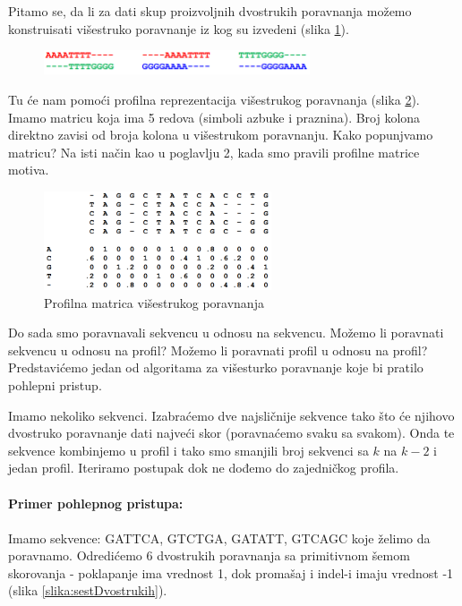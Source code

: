  
Pitamo se, da li za dati skup proizvoljnih dvostrukih poravnanja možemo konstruisati višestruko poravnanje iz kog su izvedeni (slika \ref{slika:dvostruka}).

\begin{figure}[h!]
\centering
\includegraphics[width=0.7\textwidth]{poglavlja/5/slike/dvostruka.png}
\caption{}
\label{slika:dvostruka}
\end{figure}

Tu će nam pomoći profilna reprezentacija višestrukog poravnanja (slika \ref{slika:profilVisetruko}). Imamo matricu koja ima 5 redova (simboli azbuke i praznina). Broj kolona direktno zavisi od broja kolona u višestrukom poravnanju. Kako popunjvamo matricu? Na isti način kao u poglavlju 2, kada smo pravili profilne matrice motiva. 


\begin{figure}[h!]
\centering
\includegraphics[width=0.6\textwidth]{poglavlja/5/slike/profilVisestruko.png}
\caption{Profilna matrica višestrukog poravnanja}
\label{slika:profilVisetruko}
\end{figure}

Do sada smo poravnavali sekvencu u odnosu na sekvencu. Možemo li poravnati sekvencu u odnosu na profil? Možemo li poravnati profil u odnosu na profil? Predstavićemo jedan od algoritama za višesturko poravnanje koje bi pratilo pohlepni pristup. 

Imamo nekoliko sekvenci. Izabraćemo dve najsličnije sekvence tako što će njihovo dvostruko poravnanje dati najveći skor (poravnaćemo svaku sa svakom). Onda te sekvence kombinjemo u profil i tako smo smanjili broj sekvenci sa $k$ na $k-2$ i jedan profil. Iteriramo postupak dok ne dođemo do zajedničkog profila. 
\\
\\
\noindent\textbf{Primer pohlepnog pristupa:}
\\
\\\noindent Imamo sekvence: GATTCA, GTCTGA, GATATT, GTCAGC koje želimo da poravnamo. Odredićemo 6 dvostrukih poravnanja sa primitivnom šemom skorovanja - poklapanje ima vrednost 1, dok promašaj i indel-i imaju vrednost -1 (slika \ref{slika:sestDvostrukih}).

